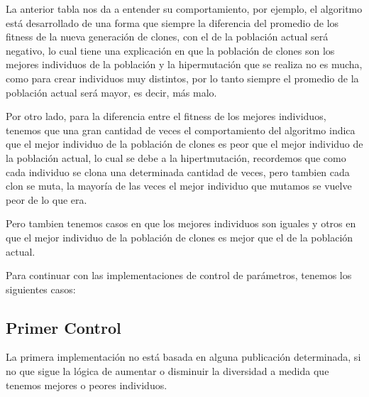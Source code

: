 La anterior tabla nos da a entender su comportamiento,
por ejemplo, el algoritmo está desarrollado de una forma que siempre
la diferencia del promedio de los  fitness de la nueva generación de clones,
con  el de la población actual será negativo, lo cual tiene una explicación
en que la población de clones son los mejores individuos de la población
y la hipermutación que se realiza no es mucha, como para crear individuos
muy distintos, por lo tanto siempre el promedio de la población actual será
mayor, es decir, más malo.

Por otro lado, para la diferencia entre el fitness de los mejores individuos,
tenemos que una gran cantidad de veces el comportamiento del algoritmo
indica que el mejor individuo de la población de clones es peor que
el mejor individuo de la población actual, lo cual se debe a la hipertmutación,
recordemos que como cada individuo se clona una determinada cantidad de veces,
pero tambien cada clon se muta, la mayoría de las veces el mejor individuo que
mutamos se vuelve peor de lo que era.

Pero tambien tenemos casos en que los mejores individuos son iguales
y otros en que el mejor individuo de la población de clones es mejor
que el de la población actual.

Para continuar con las implementaciones de control de parámetros,
tenemos los siguientes casos:
\newpage
\subsection{Primer Control}

La primera implementación no está basada en alguna publicación determinada,
si no que sigue la lógica de aumentar o disminuir la diversidad a medida
que tenemos mejores o peores individuos.

